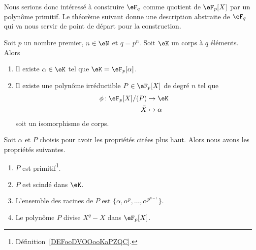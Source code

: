 Nous serions donc intéressé à construire $\eF_{q}$ comme quotient de \( \eF_p[X]\) par un polynôme primitif. Le théorème suivant donne une description abstraite de \( \eF_q\) qui va nous servir de point de départ pour la construction.
\begin{theorem}    \label{ThoqSludu}
    Soit \( p\) un nombre premier, \( n\in \eN\) et \( q=p^n\). Soit \( \eK\) un corps à \( q\) éléments. Alors
    \begin{enumerate}
        \item
            Il existe \( \alpha\in \eK\) tel que \( \eK=\eF_p[\alpha]\).
        \item
            Il existe une polynôme irréductible \( P\in\eF_p[X]\) de degré \( n\) tel que
            \begin{equation}        \label{EqWlMhhm}
                \begin{aligned}
                    \phi\colon \eF_p[X]/(P)&\to \eK \\
                    \bar X&\mapsto \alpha
                \end{aligned}
            \end{equation}
            soit un isomorphisme de corps.
    \end{enumerate}
    Soit \( \alpha\) et \( P\) choisis pour avoir les propriétés citées plus haut. Alors nous avons les propriétés suivantes.
    \begin{enumerate}
        \item
            \( P\) est primitif\footnote{Définition~\ref{DEFooDVOOooKaPZQC}.}.
        \item
            \( P\) est scindé dans \( \eK\).
        \item
            L'ensemble des racines de \( P\) est \( \{ \alpha,\alpha^p,\ldots, \alpha^{p^{n-1}} \}\).
        \item
            Le polynôme \( P\) divise \( X^q-X\) dans \( \eF_p[X]\).
    \end{enumerate}
\end{theorem}

